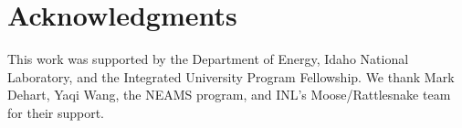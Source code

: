 \documentclass{anstrans}
\begin{document}

\section{Acknowledgments}
This work was supported by the Department of Energy, Idaho National Laboratory, and the Integrated University Program Fellowship.  We thank Mark Dehart, Yaqi Wang, the NEAMS program, and INL's Moose/Rattlesnake team for their support.



\end{document}

